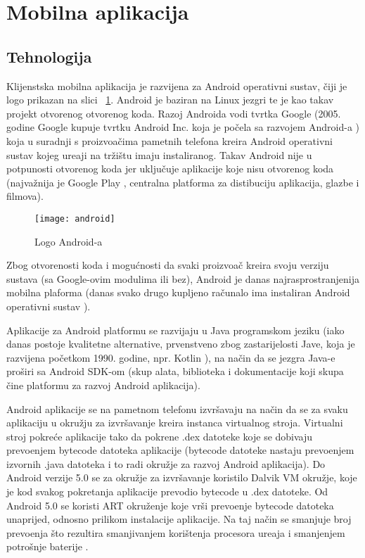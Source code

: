 \section{Mobilna aplikacija}

\subsection{Tehnologija}
Klijenstska mobilna aplikacija je razvijena za Android operativni sustav, \v{c}iji je logo prikazan na slici ~\ref{fig:android}. Android je baziran na Linux jezgri te je kao takav projekt otvorenog otvorenog koda. Razoj Androida vodi tvrtka Google (2005. godine Google kupuje tvrtku Android Inc. koja je po\v{c}ela sa razvojem Android-a \cite{kupnjaAndroida}) koja u suradnji s proizvo\dj a\v{c}ima pametnih telefona kreira Android operativni sustav kojeg ure\dj aji na tr\v{z}i\v{s}tu imaju instaliranog. Takav Android nije u potpunosti otvorenog koda jer uklju\v{c}uje aplikacije koje nisu otvorenog koda (najva\v{z}nija je Google Play \cite{googlePlay}, centralna platforma za distibuciju aplikacija, glazbe i filmova).

\begin{figure}[!htbp]
	\begin{center}
 \texttt{[image: android]}
 \caption{Logo Android-a}
 \label{fig:android}
	\end{center}
\end{figure}

Zbog otvorenosti koda i mogu\'{c}nosti da svaki proizvo\dj a\v{c} kreira svoju verziju sustava (sa Google-ovim modulima ili bez), Android je danas najrasprostranjenija mobilna plaforma (danas svako drugo kupljeno ra\v{c}unalo ima instaliran Android operativni sustav \cite{androidDominacija}).

Aplikacije za Android platformu se razvijaju u Java programskom jeziku (iako danas postoje kvalitetne alternative, prvenstveno zbog zastarijelosti Jave, koja je razvijena po\v{c}etkom 1990. godine, npr. Kotlin \cite{kotlin}), na na\v{c}in da se jezgra Java-e pro\v{s}iri sa Android SDK-om (skup alata, biblioteka i dokumentacije koji skupa \v{c}ine platformu za razvoj Android aplikacija). 

Android aplikacije se na pametnom telefonu izvr\v{s}avaju na na\v{c}in da se za svaku aplikaciju u okru\v{z}ju za izvr\v{s}avanje kreira instanca virtualnog stroja. 
Virtualni stroj pokre\'{c}e aplikacije tako da pokrene .dex datoteke koje se dobivaju prevo\dj enjem bytecode datoteka aplikacije (bytecode datoteke nastaju prevo\dj enjem izvornih .java datoteka i to radi okru\v{z}je za razvoj Android aplikacija). Do Android verzije 5.0 se za okru\v{z}je za izvr\v{s}avanje koristilo Dalvik VM okru\v{z}je, koje je kod svakog pokretanja aplikacije prevodio bytecode u .dex datoteke. Od Android 5.0 se koristi ART okru\v{z}enje koje vr\v{s}i prevo\dj enje bytecode datoteka unaprijed, odnosno prilikom instalacije aplikacije. Na taj na\v{c}in se smanjuje broj prevo\dj enja \v{s}to rezultira smanjivanjem kori\v{s}tenja procesora ure\dj aja i smanjenjem potro\v{s}nje baterije \cite{dalvikArt}.



